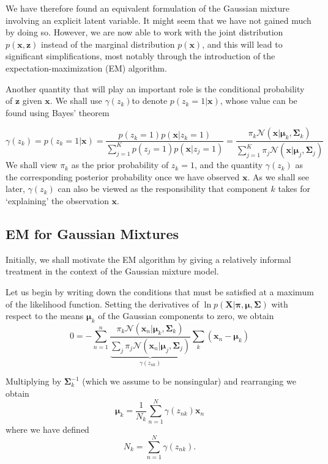 \documentclass[a4paper, 11pt]{article}
\numberwithin{equation}{subsection}
\begin{document}
We have therefore found an equivalent formulation of the Gaussian mixture involving an explicit latent variable. It might seem that we have not gained much by doing so. However, we are now able to work with the joint distribution $p(\mathbf x, \mathbf z)$ instead of the marginal distribution $p(\mathbf x)$, and this will lead to significant simplifications, most notably through the introduction of the expectation-maximization (EM) algorithm.

Another quantity that will play an important role is the conditional probability of $\mathbf z$ given $\mathbf x$. We shall use $\gamma(z_k)$to denote $p(z_k=1|\mathbf x)$, whose value can be found using Bayes’ theorem

\begin{equation}
\gamma(z_k)=p(z_k=1|\mathbf x)=\frac{p(z_k=1)p(\mathbf x|z_k=1)}{\sum_{j=1}^Kp(z_j=1)p(\mathbf x|z_j=1)}=\frac{\pi_k\mathcal N(\mathbf x|\boldsymbol\mu_k,\boldsymbol\Sigma_k)}{\sum_{j=1}^K\pi_j\mathcal N(\mathbf x|\boldsymbol\mu_j,\boldsymbol\Sigma_j)}
\end{equation}
We shall view $\pi_k$ as the prior probability of $z_k=1$, and the quantity $\gamma(z_k)$ as the corresponding posterior probability once we have observed $\mathbf x$. As we shall see later, $\gamma(z_k)$ can also be viewed as the responsibility that component $k$ takes for ‘explaining’ the observation $\mathbf x$.




\subsection{EM for Gaussian Mixtures}
Initially, we shall motivate the EM algorithm by giving a relatively informal treatment in the context of the Gaussian mixture model.

Let us begin by writing down the conditions that must be satisfied at a maximum of the likelihood function. Setting the derivatives of $\ln p(\mathbf X|\boldsymbol\pi,\boldsymbol\mu,\boldsymbol\Sigma)$ with respect to the means $\boldsymbol\mu_k$ of the Gaussian components to zero, we obtain
\begin{equation}
0=-\sum_{n=1}^n\frac{\pi_k\mathcal N(\mathbf x_n|\boldsymbol\mu_k,\boldsymbol\Sigma_k)}{\underbrace{\sum_j\pi_j\mathcal N(\mathbf x_n|\boldsymbol\mu_j,\boldsymbol\Sigma_j)}_{\gamma(z_{nk})}}\sum_k(\mathbf x_n-\boldsymbol\mu_k)
\end{equation}

Multiplying by $\boldsymbol\Sigma_k^{-1}$ (which we assume to be nonsingular) and rearranging we obtain
\begin{equation}
\boldsymbol\mu_k=\frac{1}{N_k}\sum_{n=1}^N\gamma(z_{nk})\mathbf x_n
\end{equation}
where we have defined
\begin{equation}
 N_k=\sum_{n=1}^N\gamma(z_{nk}).
  \end{equation} 
\end{document}
